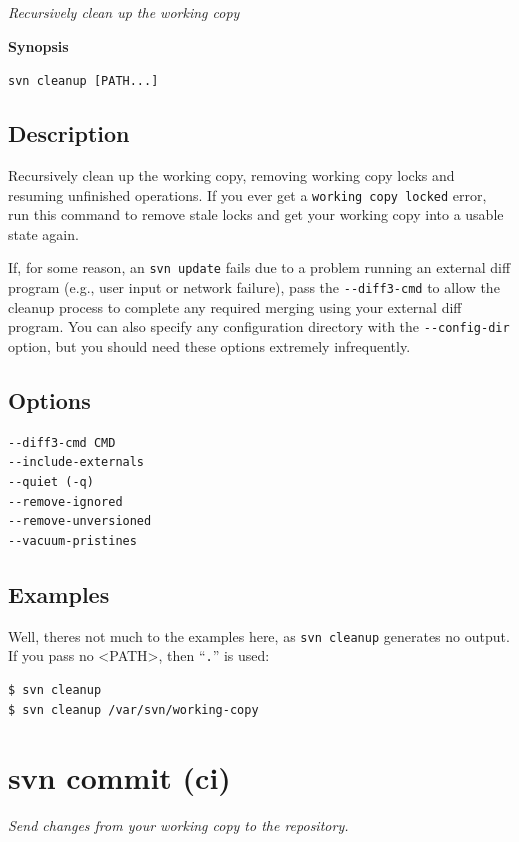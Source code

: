 \emph{Recursively clean up the working copy}

\textbf{Synopsis}

\texttt{svn\ cleanup\ {[}PATH...{]}}

\subsection{Description}

Recursively clean up the working copy, removing working copy locks and
resuming unfinished operations. If you ever get a
\texttt{working\ copy\ locked} error, run this command to remove stale
locks and get your working copy into a usable state again.

If, for some reason, an \texttt{svn\ update} fails due to a problem
running an external diff program (e.g., user input or network failure),
pass the \texttt{-\/-diff3-cmd} to allow the cleanup process to complete
any required merging using your external diff program. You can also
specify any configuration directory with the \texttt{-\/-config-dir}
option, but you should need these options extremely infrequently.

\subsection{Options}

\begin{verbatim}
--diff3-cmd CMD
--include-externals
--quiet (-q)
--remove-ignored
--remove-unversioned
--vacuum-pristines
\end{verbatim}

\subsection{Examples}

Well, there\textquotesingle s not much to the examples here, as
\texttt{svn\ cleanup} generates no output. If you pass no
\textless PATH\textgreater, then ``\texttt{.}'' is used:

\begin{verbatim}
$ svn cleanup
$ svn cleanup /var/svn/working-copy
\end{verbatim}

\section{svn commit (ci)}\label{svn.ref.svn.c.commit}

\emph{Send changes from your working copy to the repository.}

